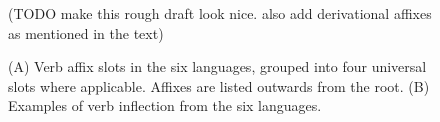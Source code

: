 \documentclass[11pt,letterpaper]{article}
\newcommand\mhahn[1]{{\color{red}(#1)}}
\newcounter{def}
\begin{document}
\begin{figure}

\mhahn{TODO make this rough draft look nice. also add derivational affixes as mentioned in the text}
\caption{(A) Verb affix slots in the six languages, grouped into four universal slots where applicable. Affixes are listed outwards from the root. (B) Examples of verb inflection from the six languages.}\label{tab:examples-verbs}
\end{figure}
 
 
\end{document}
